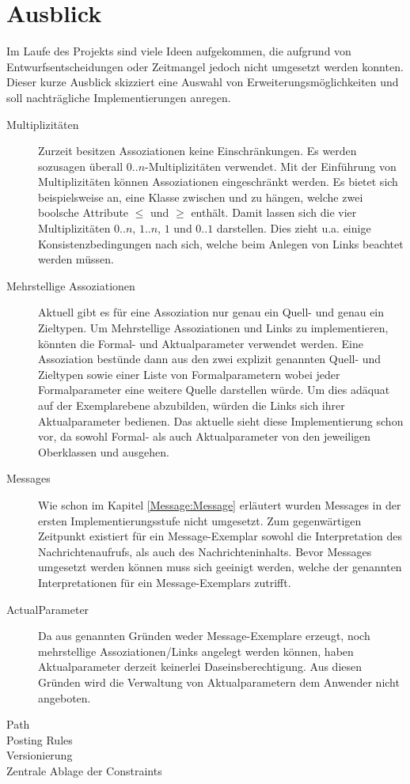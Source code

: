 \section{Ausblick}
Im Laufe des Projekts sind viele Ideen aufgekommen, die aufgrund von Entwurfsentscheidungen oder Zeitmangel 
jedoch nicht umgesetzt werden konnten. Dieser kurze Ausblick skizziert eine Auswahl von Erweiterungsmöglichkeiten und 
soll nachträgliche Implementierungen anregen.

\begin{description}
  \item[Multiplizitäten] Zurzeit besitzen Assoziationen keine Einschränkungen. 
Es werden sozusagen überall $0..n$-Multiplizitäten verwendet. 
Mit der Einführung von Multiplizitäten können Assoziationen eingeschränkt werden.
Es bietet sich beispielsweise an, eine Klasse  zwischen  und  zu hängen,
welche zwei boolsche Attribute $\leq$ und $\geq$ enthält. 
Damit lassen sich die vier Multiplizitäten $0..n$, $1..n$, $1$ und $0..1$ darstellen.
Dies zieht u.a. einige Konsistenzbedingungen nach sich, welche beim Anlegen von Links beachtet werden müssen. 
  \item[Mehrstellige Assoziationen] Aktuell gibt es für eine Assoziation nur genau ein Quell- und genau ein Zieltypen. 
  Um Mehrstellige Assoziationen und Links zu implementieren, könnten die Formal- und Aktualparameter verwendet werden. 
  Eine Assoziation bestünde dann aus den zwei explizit genannten Quell- und Zieltypen sowie einer Liste von Formalparametern 
  wobei jeder Formalparameter eine weitere Quelle darstellen würde. Um dies adäquat auf der Exemplarebene abzubilden, 
  würden die Links sich ihrer Aktualparameter bedienen. Das aktuelle \MM sieht diese Implementierung schon vor, da sowohl 
  Formal- als auch Aktualparameter von den jeweiligen Oberklassen  und  ausgehen.
  \item[Messages] Wie schon im Kapitel \ref{Message:Message} erläutert wurden Messages in der ersten Implementierungsstufe nicht umgesetzt. 
  Zum gegenwärtigen Zeitpunkt existiert für ein Message-Exemplar sowohl die Interpretation des Nachrichtenaufrufs, als auch des Nachrichteninhalts.
Bevor Messages umgesetzt werden können muss sich geeinigt werden, welche der genannten Interpretationen für ein Message-Exemplars zutrifft. 
  \item[ActualParameter] Da aus genannten Gründen weder Message-Exemplare erzeugt, noch mehrstellige Assoziationen/Links angelegt werden können, 
  haben Aktualparameter derzeit keinerlei Daseinsberechtigung. Aus diesen Gründen wird die Verwaltung von Aktualparametern dem Anwender nicht angeboten.
  \item[Path] 
  \item[Posting Rules] 
  \item[Versionierung] 
  \item[Zentrale Ablage der Constraints] 
\end{description}
  